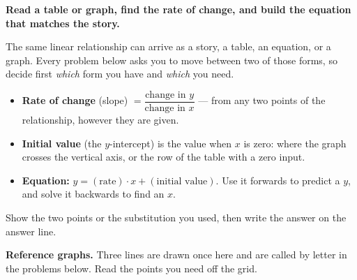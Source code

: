 \documentclass[12pt]{article}
\begin{document}

\noindent\textbf{Read a table or graph, find the rate of change, and build the
equation that matches the story.}

\smallskip
\noindent\small The same linear relationship can arrive as a story, a table, an
equation, or a graph. Every problem below asks you to move between two of those
forms, so decide first \emph{which} form you have and \emph{which} you need.
\begin{itemize}[leftmargin=1.1cm, itemsep=1pt, topsep=2pt]
  \item \textbf{Rate of change} (slope) $=\dfrac{\text{change in } y}{\text{change in } x}$
        --- from any two points of the relationship, however they are given.
  \item \textbf{Initial value} (the $y$-intercept) is the value when $x$ is
        zero: where the graph crosses the vertical axis, or the row of the
        table with a zero input.
  \item \textbf{Equation:} $y = (\text{rate}) \cdot x + (\text{initial value})$.
        Use it forwards to predict a $y$, and solve it backwards to find an $x$.
\end{itemize}
Show the two points or the substitution you used, then write the answer on the
answer line.\normalsize

\smallskip
\noindent\textbf{Reference graphs.} Three lines are drawn once here and are
called by letter in the problems below. Read the points you need off the grid.
\end{document}
